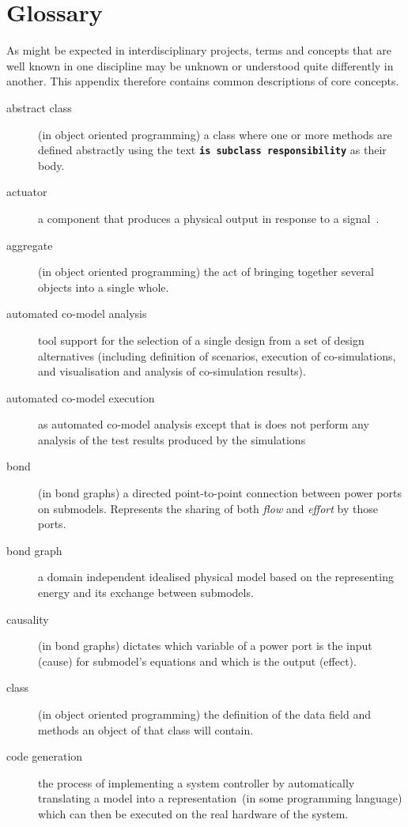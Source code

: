 \documentclass{crescendorepchap}
\begin{document}
\appendix
\newpage


\label{ch:bib} %

\chapter{Glossary}\label{app:Glossary}

As might be expected in interdisciplinary projects, terms and
concepts that are well known in one discipline may be unknown or
understood quite differently in another. This appendix therefore contains
common descriptions of core concepts.

\begin{description}
\item[abstract class] (in object oriented programming) a class where one or more methods are defined abstractly using the text \textbf{\texttt{is subclass responsibility}} as their body.
\item[actuator] a component that produces a physical output in response to a signal~\cite{IEEE100}.
\item[aggregate] (in object oriented programming) the act of bringing together several objects into a single whole.
\item[automated co-model analysis] tool support for the selection of a single design from a set of design alternatives (including definition of scenarios, execution of co-simulations, and visualisation and analysis of co-simulation results).
\item[automated co-model execution] as automated co-model analysis except that is does not perform any analysis of the test results produced by the simulations
\item[bond] (in bond graphs) a directed point-to-point connection between power ports on submodels.  Represents the sharing of both \textit{flow} and \textit{effort} by those ports.
\item[bond graph] a domain independent idealised physical model based on the representing energy and its exchange between submodels.
\item[causality] (in bond graphs) dictates which variable of a power port is the input (cause) for submodel's equations and which is the output (effect).
\item[class] (in object oriented programming) the definition of the data field and methods an object of that class will contain.
\item[code generation] the process of implementing a system controller by automatically translating a model into a representation~(in some programming language) which can then be executed on the real hardware of the system.

\end{description}
\end{document}
